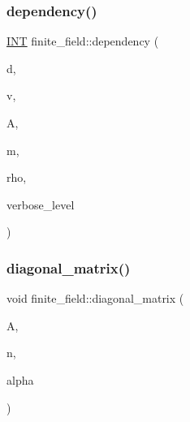 \subsubsection{\texorpdfstring{dependency()}{dependency()}}
{\footnotesize\ttfamily \mbox{\hyperlink{galois_8h_a09fddde158a3a20bd2dcadb609de11dc}{I\+NT}} finite\+\_\+field\+::dependency (\begin{DoxyParamCaption}\item[{\mbox{\hyperlink{galois_8h_a09fddde158a3a20bd2dcadb609de11dc}{I\+NT}}}]{d,  }\item[{\mbox{\hyperlink{galois_8h_a09fddde158a3a20bd2dcadb609de11dc}{I\+NT}} $\ast$}]{v,  }\item[{\mbox{\hyperlink{galois_8h_a09fddde158a3a20bd2dcadb609de11dc}{I\+NT}} $\ast$}]{A,  }\item[{\mbox{\hyperlink{galois_8h_a09fddde158a3a20bd2dcadb609de11dc}{I\+NT}}}]{m,  }\item[{\mbox{\hyperlink{galois_8h_a09fddde158a3a20bd2dcadb609de11dc}{I\+NT}} $\ast$}]{rho,  }\item[{\mbox{\hyperlink{galois_8h_a09fddde158a3a20bd2dcadb609de11dc}{I\+NT}}}]{verbose\+\_\+level }\end{DoxyParamCaption})}

\mbox{\label{classfinite__field_a6957896876c77d97c6cf06685652100a}} 
\subsubsection{\texorpdfstring{diagonal\+\_\+matrix()}{diagonal\_matrix()}}
{\footnotesize\ttfamily void finite\+\_\+field\+::diagonal\+\_\+matrix (\begin{DoxyParamCaption}\item[{\mbox{\hyperlink{galois_8h_a09fddde158a3a20bd2dcadb609de11dc}{I\+NT}} $\ast$}]{A,  }\item[{\mbox{\hyperlink{galois_8h_a09fddde158a3a20bd2dcadb609de11dc}{I\+NT}}}]{n,  }\item[{\mbox{\hyperlink{galois_8h_a09fddde158a3a20bd2dcadb609de11dc}{I\+NT}}}]{alpha }\end{DoxyParamCaption})}

\mbox{\label{classfinite__field_abc5e4494690f56fb1523b4a956d38c8b}} 
